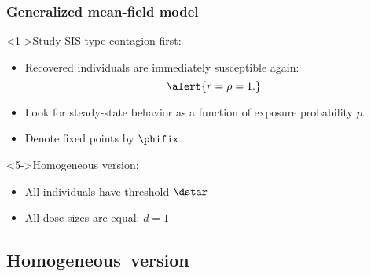 \begin{frame}
  \frametitle{Generalized mean-field model}

  \begin{block}<1->{Study SIS-type contagion first:}
    \begin{itemize}
    \item<2->
      Recovered individuals are immediately susceptible again:
      $$
      \alert{r=\rho=1.}
      $$
    \item<3->
      Look for steady-state behavior 
      as a function of exposure probability $p$.
    \item<4->
      Denote fixed points by $\phifix$.
    \end{itemize}
  \end{block}
  
  \begin{block}<5->{Homogeneous version:}
    \begin{itemize}
    \item<6->
      All individuals have threshold $\dstar$
    \item<7->
      All dose sizes are equal: $d=1$
    \end{itemize}
  \end{block}

\end{frame}


\subsection{Homogeneous\ version}

